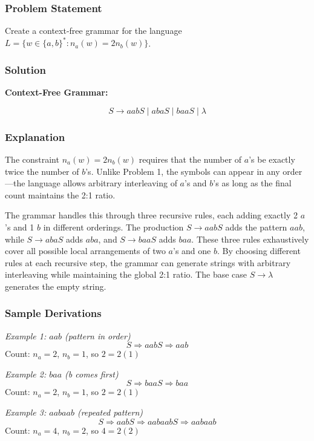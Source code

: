 \documentclass[12pt]{article}
\begin{document}
\subsubsection{Problem Statement}
Create a context-free grammar for the language $L = \{w \in \{a,b\}^* : n_a(w) = 2n_b(w)\}$.

\subsubsection{Solution}

\textbf{Context-Free Grammar:}

$$S \rightarrow aabS \mid abaS \mid baaS \mid \lambda$$

\subsubsection{Explanation}

The constraint $n_a(w) = 2n_b(w)$ requires that the number of $a$'s be exactly twice the number of $b$'s. Unlike Problem 1, the symbols can appear in any order---the language allows arbitrary interleaving of $a$'s and $b$'s as long as the final count maintains the 2:1 ratio.

The grammar handles this through three recursive rules, each adding exactly 2 $a$'s and 1 $b$ in different orderings. The production $S \rightarrow aabS$ adds the pattern $aab$, while $S \rightarrow abaS$ adds $aba$, and $S \rightarrow baaS$ adds $baa$. These three rules exhaustively cover all possible local arrangements of two $a$'s and one $b$. By choosing different rules at each recursive step, the grammar can generate strings with arbitrary interleaving while maintaining the global 2:1 ratio. The base case $S \rightarrow \lambda$ generates the empty string.

\subsubsection{Sample Derivations}

\textit{Example 1: $aab$ (pattern in order)}
$$S \Rightarrow aabS \Rightarrow aab$$
Count: $n_a = 2$, $n_b = 1$, so $2 = 2(1)$ \checkmark

\textit{Example 2: $baa$ (b comes first)}
$$S \Rightarrow baaS \Rightarrow baa$$
Count: $n_a = 2$, $n_b = 1$, so $2 = 2(1)$ \checkmark

\textit{Example 3: $aabaab$ (repeated pattern)}
$$S \Rightarrow aabS \Rightarrow aabaabS \Rightarrow aabaab$$
Count: $n_a = 4$, $n_b = 2$, so $4 = 2(2)$ \checkmark
\end{document}
